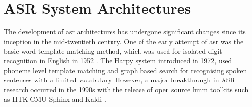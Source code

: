 
\section{ASR System Architectures} \label{sec:Literature-architecture}

The development of \gls{asr} architectures has undergone significant changes since its inception in the mid-twentieth century. One of the early attempt of \gls{asr} was the basic word template matching method, which was used for isolated digit recognition in English in 1952 \cite{davis1952automatic}. The Harpy system  \cite{lowerre1976harpy}  introduced in 1972, used phoneme level template matching and graph based search for recognising spoken sentences with a limited vocabulary. However, a major breakthrough in ASR research occurred in the 1990s with the release of open source \gls{hmm} toolkits such as HTK \cite{young2002htk} CMU Sphinx \cite{lee1990overview} and Kaldi \cite{povey2011kaldi}.

